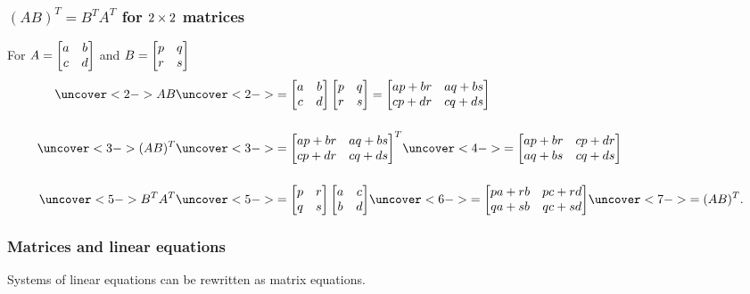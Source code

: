 \documentclass[9pt]{beamer}
\begin{document}
\begin{frame}[t]
 \frametitle{$(AB)^T=B^TA^T$ for $2\times 2$ matrices}
  For $A=\left[\begin{matrix} a & b \\ c & d \end{matrix}\right]$ and $B=\left[\begin{matrix} p & q \\ r & s \end{matrix}\right]$ 
  \begin{align*}
   \uc<2->{AB} &\uc<2->{= \bbm a & b \\ c & d \ebm \bbm p & q \\ r & s \ebm
       = \bbm ap+br & aq+bs \\ cp+dr & cq+ds \ebm} \\[3ex]
   \uc<3->{(AB)^T} &\uc<3->{= \bbm ap+br & aq+bs \\ cp+dr & cq+ds \ebm^T }
           \uc<4->{= \bbm ap+br & cp+dr \\ aq+bs & cq+ds \ebm} \\[3ex]
   \uc<5->{B^TA^T} &\uc<5->{= \bbm p & r \\ q & s \ebm \bbm a & c \\ b & d \ebm} 
           \uc<6->{= \bbm pa+rb & pc+rd \\ qa+sb & qc+sd \ebm }
           \uc<7->{= (AB)^T. }
  \end{align*}
\end{frame}

\begin{frame}[t]
 \frametitle{Matrices and linear equations}
 Systems of linear equations can be rewritten as matrix equations.
\end{frame}
\end{document}
